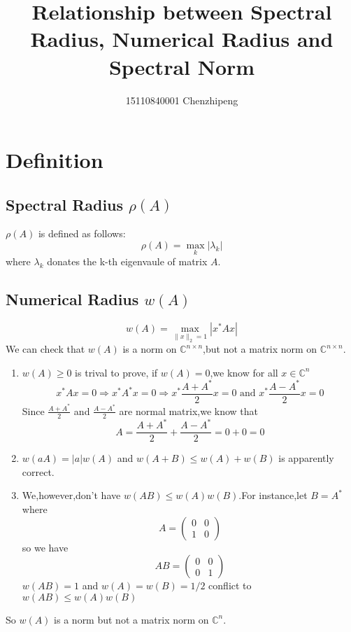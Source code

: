 \documentclass[a4paper,12pt]{article}
\author{15110840001 Chenzhipeng}
\title{Relationship between Spectral Radius, Numerical Radius and Spectral Norm}
\begin{document}
\maketitle

\section{ Definition }

\subsection{Spectral Radius $\rho(A)$}
$\rho(A)$ is defined as follows:
\[ \rho(A) = \max_k |\lambda_k|  \]
where $\lambda_k$ donates the k-th eigenvaule of matrix $A$.

\subsection{Numerical Radius $w(A)$}

\[ w(A) = \max_{\|x\|_2=1} |x^*Ax| \]
We can check that $w(A)$ is a norm on $\mathbb{C}^{n \times n}$,but not a matrix norm on $\mathbb{C}^{n \times n}$.

\begin{enumerate}
\item
$ w(A) \geq 0 $ is trival to prove, if $w(A) = 0$,we know for all $x \in \mathbb{C}^n $
\[ x^*Ax = 0 \Longrightarrow x^*A^*x = 0 \Longrightarrow x^* \frac{A + A^*}{2} x = 0 \mbox{ and } x^*\frac{A - A^*}{2} x = 0 \]
Since $\frac{A + A^*}{2}$ and $\frac{A - A^*}{2}$ are normal matrix,we know that 
\[ A= \frac{A + A^*}{2} + \frac{A - A^*}{2} = 0 + 0 = 0 \]
\item
$w(aA) = |a| w(A)$ and $w(A+B) \leq w(A) + w(B)$ is apparently correct.
\item
We,however,don't have $ w(AB) \leq w(A)w(B) $.For instance,let $B= A^*$ where
\[ A = \left( \begin{matrix}
0 & 0 \\
1 & 0
\end{matrix} \right)\]
so we have 
\[ AB = \left( \begin{matrix}
0 & 0 \\
0 & 1
\end{matrix} \right)\]
$w(AB) = 1$ and $w(A) = w(B) = 1/2$ conflict to $ w(AB) \leq w(A)w(B) $
\end{enumerate}

So $w(A)$ is a norm but not a matrix norm on $\mathbb{C}^n$.
\end{document}
